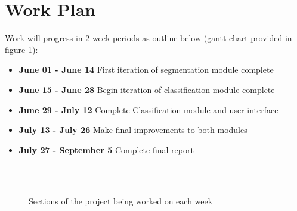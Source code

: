 \documentclass[11pt, titlepage, oneside]{article}
\theoremstyle{plain}
\theoremstyle{definition}
\theoremstyle{remark}
\begin{document}
	
	\section{Work Plan}
	Work will progress in 2 week periods as outline below (gantt chart provided in figure \ref{fig:gantt}):
		\begin{itemize}
			\item \textbf{June 01 - June 14} First iteration of segmentation module complete
			\item \textbf{June 15 - June 28} Begin iteration of classification module complete
			\item \textbf{June 29 - July 12} Complete Classification module and user interface
			\item \textbf{July 13 - July 26} Make final improvements to both modules
			\item \textbf{July 27 - September 5} Complete final report
		\end{itemize}

		\begin{figure}[H]
		\center
		\begin{ganttchart}[vgrid, hgrid style/.style=red,x unit=15mm,]{1}{9}
			 \\
			 \\
			 
			 
			  
		\end{ganttchart}

		\caption{Sections of the project being worked on each week}
		\label{fig:gantt}
		\end{figure}

\end{document}
